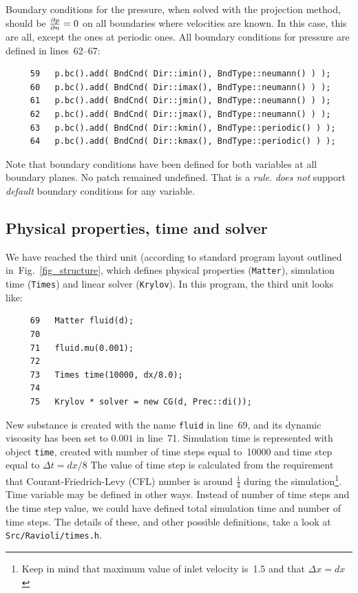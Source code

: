 Boundary conditions for the pressure, when solved with the projection method, should
be $\frac{\partial p}{\partial n} = 0$ on all boundaries where velocities are known.
In this case, this are all, except the ones at periodic ones. All boundary conditions
for pressure are defined in lines~62--67:
%
{\small \begin{verbatim}
     59   p.bc().add( BndCnd( Dir::imin(), BndType::neumann() ) );
     60   p.bc().add( BndCnd( Dir::imax(), BndType::neumann() ) );
     61   p.bc().add( BndCnd( Dir::jmin(), BndType::neumann() ) );
     62   p.bc().add( BndCnd( Dir::jmax(), BndType::neumann() ) );
     63   p.bc().add( BndCnd( Dir::kmin(), BndType::periodic() ) );
     64   p.bc().add( BndCnd( Dir::kmax(), BndType::periodic() ) );
\end{verbatim}}
%
Note that boundary conditions have been defined for both variables at all 
boundary planes. No patch remained undefined. That is a {\em rule}. 
{\psiboil} {\em does not} support {\em default} boundary conditions for 
any variable. 

\subsection{Physical properties, time and solver}

We have reached the third unit (according to standard {\psiboil} program
layout outlined in~Fig.~\ref{fig_structure}, which defines physical 
properties ({\tt Matter}), simulation time ({\tt Times}) and linear
solver ({\tt Krylov}). In this program, the third unit looks like:
%
{\small \begin{verbatim}
     69   Matter fluid(d);
     70
     71   fluid.mu(0.001);
     72
     73   Times time(10000, dx/8.0);
     74
     75   Krylov * solver = new CG(d, Prec::di());
\end{verbatim}}
%
New substance is created with the name {\tt fluid} in line~69, and its
dynamic viscosity has been set to $0.001$ in line~71. Simulation time
is represented with object {\tt time}, created with number of time
steps equal to~10000 and time step equal to $\Delta t=dx/8$
The value of time step is calculated from the requirement 
that Courant-Friedrich-Levy (CFL) number is around $\frac{1}{4}$ during the
simulation\footnote{Keep in mind that maximum value of inlet velocity is~1.5
and that $\Delta x = dx$}. Time variable may be defined in
other ways. Instead of number of time steps and the time step value,
we could have defined total simulation time and number of time steps.
The details of these, and other possible definitions, take a look at
{\tt Src/Ravioli/times.h}.

